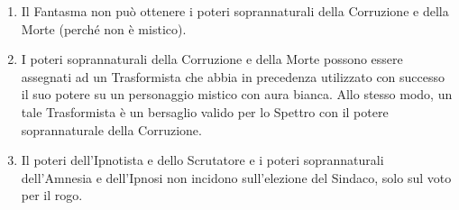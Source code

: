\documentclass[a4paper,10pt]{article}
\begin{document}
\begin{enumerate}
 \item Il Fantasma non può ottenere i poteri soprannaturali della Corruzione e della Morte (perché non è mistico).
 
 \item I poteri soprannaturali della Corruzione e della Morte possono essere assegnati ad un Trasformista che abbia in precedenza utilizzato con successo il suo potere su un personaggio mistico con aura bianca. Allo stesso modo, un tale Trasformista è un bersaglio valido per lo Spettro con il potere soprannaturale della Corruzione.
 
 \item Il poteri dell'Ipnotista e dello Scrutatore e i poteri soprannaturali dell'Amnesia e dell'Ipnosi non incidono sull'elezione del Sindaco, solo sul voto per il rogo.
 
 
 
 

\end{enumerate}
\end{document}
